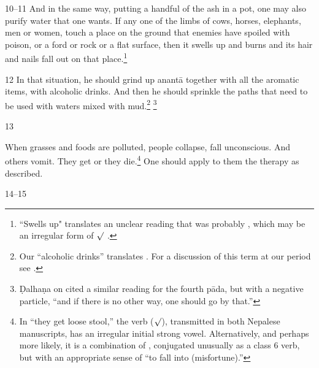 \begin{translation}
\item
 [10--11]  And in the same way, putting a handful of  the ash in a pot, one may 
 also purify water  that  one wants.  If any one of the limbs of cows, horses,  
 elephants, men or women, touch a place on the ground that enemies have 
 spoiled with  poison, or a ford or rock or a flat surface, then it swells up and 
 burns and its  hair and nails fall out on that place.\footnote{``Swells up" 
 translates an  unclear reading that was probably , which may be 
 an irregular  form of $\surd$  
 \citep[see][175--176]{whit-root}.}  

\item
 [12]  In that situation, he should grind up  \gls{anantā} together with all the  
 aromatic items, with alcoholic drinks.  And then he should sprinkle the paths 
 that need to be used with waters mixed with  mud.\footnote{Our “alcoholic 
 drinks”  translates .  For a discussion of this  term at our period see 
 \cite[37--39 \emph{et passim}]{mchu-2021}.}  \footnote{Ḍalhaṇa on   
 cited a similar  reading for the fourth pāda, but with a negative particle, “and if 
 there is no other way, one  should go by that.”}  

\item [13]  

When grasses and foods are  polluted, people collapse, fall
unconscious. And others vomit. They get   or
they  die.\footnote{In “they get loose stool,” the verb
     ($\surd$), transmitted in both Nepalese
    manuscripts, has an irregular initial strong vowel. Alternatively, and
    perhaps more likely, it is a combination of ,
    conjugated unusually as a class 6 verb, but with an appropriate sense
    of “to fall into (misfortune).”}  One should apply to them the therapy
    as described.

\item [14--15]  


\end{translation}
